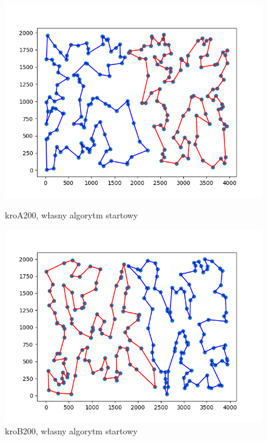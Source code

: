 \documentclass[11pt]{article}
\begin{document}
\begin{figure}[H]
    \vspace{0.5cm}

    \begin{minipage}[t]{0.45\textwidth}
        \centering
        \includegraphics[width=\linewidth]{best_paths/kroA200/traverse_greedy_vertex/split_paths_regret_TSP}
        \caption{kroA200, własny algorytm startowy}
    \end{minipage}
    \hfill
    \begin{minipage}[t]{0.45\textwidth}
        \centering
        \includegraphics[width=\linewidth]{best_paths/kroB200/traverse_greedy_vertex/split_paths_regret_TSP}
        \caption{kroB200, własny algorytm startowy}
    \end{minipage}
    \label{fig:minipage-greedy-vertex}
\end{figure}
\end{document}
